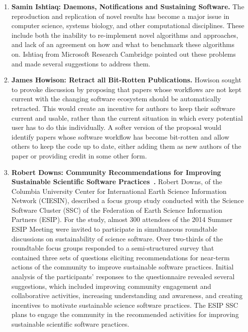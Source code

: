 \documentclass[11pt, oneside]{amsart}
\begin{document}
\begin{enumerate}
\item \textbf{Samin Ishtiaq: Daemons, Notifications and Sustaining Software. }%
The reproduction and replication of novel results has become a major issue in
computer science, systems biology, and other computational disciplines. These
include both the inability to re-implement novel algorithms and approaches, and
lack of an agreement on how and what to benchmark these algorithms on. Ishtiaq
from Microsoft Research Cambridge pointed out these problems and made several
suggestions to address them.

\item \textbf{James Howison: Retract all Bit-Rotten Publications. }%
Howison sought to provoke discussion by proposing that papers whose workflows
are not kept current with the changing software ecosystem should be
automatically retracted. This would create an incentive for authors to keep
their software current and usable, rather than the current situation in which
every potential user has to do this individually. A softer version of the
proposal would identify papers whose software workflow has become bit-rotten and
allow others to keep the code up to date, either adding them as new authors of
the paper or providing credit in some other form. %




\item \textbf{Robert Downs: Community Recommendations for Improving Sustainable
Scientific Software Practices~\cite{Downs_poster}.} Robert Downs, of the
Columbia University Center for International Earth Science Information Network
(CIESIN), described a focus group study conducted with the Science Software
Cluster (SSC) of the Federation of Earth Science Information Partners (ESIP).
For the study, almost 300 attendees of the 2014 Summer ESIP Meeting were invited
to participate in simultaneous roundtable discussions on sustainability of
science software. Over two-thirds of the roundtable focus groups responded to a
semi-structured survey that contained three sets of questions eliciting
recommendations for near-term actions of the community to improve sustainable
software practices. Initial analysis of the participants' responses to the
questionnaire revealed several suggestions, which included improving community
engagement and collaborative activities, increasing understanding and awareness,
and creating incentives to motivate sustainable science software practices. 
The ESIP SSC plans to engage the community in the recommended activities for
improving sustainable scientific software practices.


\end{enumerate}
\end{document}
